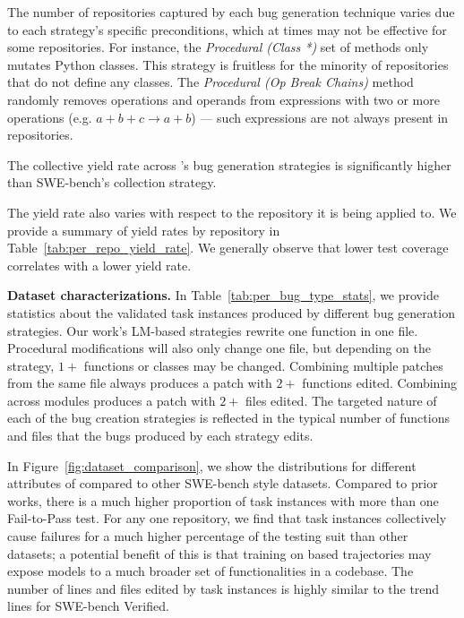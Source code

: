 

The number of repositories captured by each bug generation technique varies due to each strategy's specific preconditions, which at times may not be effective for some repositories.
For instance, the \textit{Procedural (Class *)} set of methods only mutates Python classes.
This strategy is fruitless for the minority of \bugs{} repositories that do not define any classes.
The \textit{Procedural (Op Break Chains)} method randomly removes operations and operands from expressions with two or more operations (e.g. $a+b+c \rightarrow a+b$) --- such expressions are not always present in \bugs{} repositories.

The collective yield rate across \bugs{}'s bug generation strategies is significantly higher than SWE-bench's collection strategy.



The yield rate also varies with respect to the repository it is being applied to.
We provide a summary of yield rates by repository in Table~\ref{tab:per_repo_yield_rate}.
We generally observe that lower test coverage correlates with a lower yield rate.

\textbf{Dataset characterizations.}
In Table~\ref{tab:per_bug_type_stats}, we provide statistics about the validated task instances produced by different bug generation strategies.
Our work's LM-based strategies rewrite one function in one file.
Procedural modifications will also only change one file, but depending on the strategy, $1+$ functions or classes may be changed.
Combining multiple patches from the same file always produces a patch with $2+$ functions edited.
Combining across modules produces a patch with $2+$ files edited.
The targeted nature of each of the bug creation strategies is reflected in the typical number of functions and files that the bugs produced by each strategy edits.



In Figure~\ref{fig:dataset_comparison}, we show the distributions for different attributes of \bugs{} compared to other SWE-bench style datasets.
Compared to prior works, there is a much higher proportion of task instances with more than one Fail-to-Pass test.
For any one repository, we find that \bugs{} task instances collectively cause failures for a much higher percentage of the testing suit than other datasets; a potential benefit of this is that training on \bugs{} based trajectories may expose models to a much broader set of functionalities in a codebase.
The number of lines and files edited by \bugs{} task instances is highly similar to the trend lines for SWE-bench Verified.

